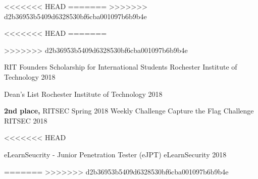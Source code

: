 <<<<<<< HEAD
=======
>>>>>>> d2b36953b5409d6328530bf6cba001097b6b9b4e


<<<<<<< HEAD
\vspace{-2.0mm}
=======

>>>>>>> d2b36953b5409d6328530bf6cba001097b6b9b4e

\begin{cvhonors}

  \cvhonor
    {} %
    {RIT Founders Scholarship for International Students} %
    {Rochester Institute of Technology} %
    {2018} %

  \cvhonor
    {} %
    {Dean's List} %
    {Rochester Institute of Technology} %
    {2018} %
    
  \cvhonor
    {} %
    {{\bf2nd place,} RITSEC Spring 2018 Weekly Challenge Capture the Flag Challenge} %
    {RITSEC} %
    {2018} %


\end{cvhonors}

<<<<<<< HEAD
\vspace{-3.0mm}

\begin{cvhonors}

  \cvhonor
    {} %
    {eLearnSeucrity - Junior Penetration Tester (eJPT)} %
    {eLearnSecurity} %
    {2018} %


\end{cvhonors}
=======
>>>>>>> d2b36953b5409d6328530bf6cba001097b6b9b4e
